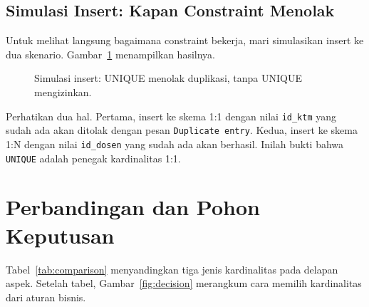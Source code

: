 \documentclass[11pt,a4paper]{article}
\begin{document}
\subsection{Simulasi Insert: Kapan Constraint Menolak}

Untuk melihat langsung bagaimana constraint bekerja, mari simulasikan insert ke dua skenario. Gambar~\ref{fig:simul} menampilkan hasilnya.

\begin{figure}[H]
	\centering
	\caption{Simulasi insert: UNIQUE menolak duplikasi, tanpa UNIQUE mengizinkan.}
	\label{fig:simul}
\end{figure}

Perhatikan dua hal. Pertama, insert ke skema 1:1 dengan nilai \texttt{id\_ktm} yang sudah ada akan ditolak dengan pesan \texttt{Duplicate entry}. Kedua, insert ke skema 1:N dengan nilai \texttt{id\_dosen} yang sudah ada akan berhasil. Inilah bukti bahwa \texttt{UNIQUE} adalah penegak kardinalitas 1:1.

\section{Perbandingan dan Pohon Keputusan}

Tabel~\ref{tab:comparison} menyandingkan tiga jenis kardinalitas pada delapan aspek. Setelah tabel, Gambar~\ref{fig:decision} merangkum cara memilih kardinalitas dari aturan bisnis.
\end{document}
